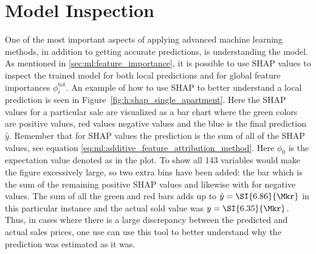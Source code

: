 \FloatBarrier
\section{Model Inspection}

One of the most important aspects of applying advanced machine learning methods, in addition to getting accurate predictions, is understanding the model. As mentioned in \autoref{sec:ml:feature_importance}, it is possible to use SHAP values to inspect the trained model for both local predictions and for global feature importances $\phi_i^\mathrm{tot}$. An example of how to use SHAP to better understand a local prediction is seen in Figure~\ref{fig:h:shap_single_apartment}. Here the SHAP values for a particular sale are visualized as a bar chart where the green colors are positive values, red values negative values and the blue is the final prediction $\hat{y}$. Remember that for SHAP values the prediction is the sum of all of the SHAP values, see equation \eqref{eq:ml:additive_feature_attribution_method}. Here $\phi_0$ is the expectation value denoted as  in the plot. To show all \num{143} variables would make the figure excessively large, so two extra bins have been added: the  bar which is the sum of the remaining positive SHAP values and likewise with  for negative values. The sum of all the green and red bars adds up to $\hat{y}=\SI{6.86}{\Mkr}$ in this particular instance and the actual sold value was $y=\SI{6.35}{\Mkr}$. Thus, in cases where there is a large discrepancy between the predicted and actual sales prices, one use can use this tool to better understand why the prediction was estimated as it was. 

